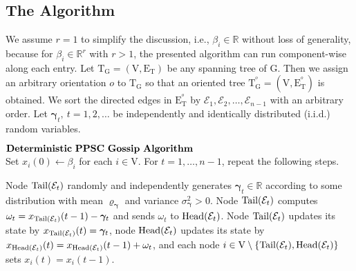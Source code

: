 \documentclass[a4paper, 11pt]{article}
\newcommand{\R}{\mathbb{R}}
\newcommand{\1}{\mathbf{1}}
\newcommand{\asf}{\mathcal{E}}
\newcommand{\Head}{\textnormal{Head}}
\newcommand{\Tail}{\textnormal{Tail}}
\newcommand{\mG}{\mathrm{G}}
\newcommand{\mV}{\mathrm{V}}
\newcommand{\mE}{\mathrm{E}}
\newcommand{\mT}{\mathrm{T}}
\newcommand{\mTG}{\mT^{^o}_{\mG}}
\newcommand{\mET}{\mE_{\mT}^{^o}}
\newcommand{\gammab}{{\bm \gamma}}
\begin{document}
\subsection{The Algorithm}
We assume $r=1$ to simplify the discussion, i.e., $\beta_i \in \mathbb{R}$ without loss of generality,  because for $\beta_i\in\mathbb{R}^r$ with $r>1$,  the presented algorithm   can run component-wise along each entry.  Let  $\mathrm{T}_{\mG}=(\mV,\mE_{\mT})$ be any spanning tree of $\mG$. Then we assign an arbitrary  orientation $o$ to $\mathrm{T}_{\mG}$ so that an oriented tree $\mTG=(\mV,\mET)$  is obtained.   We sort the directed edges in $\mET$ by $\asf_1,\asf_2,\dots,\asf_{n-1}$ with an arbitrary order. Let $\gammab_t, \ t=1,2,\dots$ be independently and identically distributed (i.i.d.) random variables.
\begin{algorithm}[htb]
	{$\mathbf{Deterministic\textnormal{ }PPSC\textnormal{ }Gossip\textnormal{ }Algorithm}$}\\
	Set $x_i(0)\gets\beta_i$ for each $i\in\mV$. For $t=1,\dots,n-1 $, repeat the following steps.
	\begin{algorithmic}[1]
		\STATE Node $\Tail(\asf_t)$ randomly and independently generates $\gammab_t\in\R$ according to some distribution with  mean  $\varrho_\gammab$ and  variance $\sigma_{\gammab}^2>0$.
		\STATE Node $\Tail(\asf_t)$ computes $\omega_t=x_{\Tail(\asf_t)}(t-1)-\gammab_t$ and sends $\omega_t$ to $\Head(\asf_t)$.
		\STATE Node $\Tail(\asf_t)$ updates its state by $x_{\Tail(\asf_t)}(t)=\gammab_t$, node $\Head(\asf_t)$ updates its state by $x_{\Head(\asf_t)}(t)=x_{\Head(\asf_t)}(t-1)+\omega_t$, and each node $i\in\mV\setminus\{\Tail(\asf_t),\Head(\asf_t)\}$ sets $x_i(t)=x_i(t-1)$.
	\end{algorithmic}
\end{algorithm}
\end{document}
